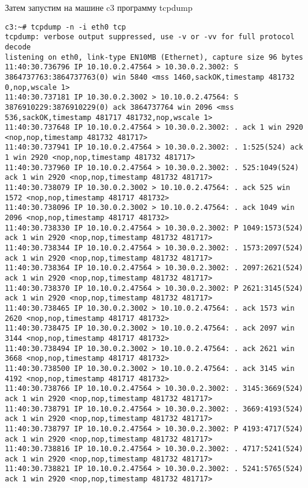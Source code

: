 \documentclass[a4paper,12pt]{article}
\begin{document}
Затем запустим на машине c3 программу tcpdump
\begin{lstlisting}
c3:~# tcpdump -n -i eth0 tcp
tcpdump: verbose output suppressed, use -v or -vv for full protocol decode
listening on eth0, link-type EN10MB (Ethernet), capture size 96 bytes
11:40:30.736796 IP 10.10.0.2.47564 > 10.30.0.2.3002: S 3864737763:3864737763(0) win 5840 <mss 1460,sackOK,timestamp 481732 0,nop,wscale 1>
11:40:30.737181 IP 10.30.0.2.3002 > 10.10.0.2.47564: S 3876910229:3876910229(0) ack 3864737764 win 2096 <mss 536,sackOK,timestamp 481717 481732,nop,wscale 1>
11:40:30.737648 IP 10.10.0.2.47564 > 10.30.0.2.3002: . ack 1 win 2920 <nop,nop,timestamp 481732 481717>
11:40:30.737941 IP 10.10.0.2.47564 > 10.30.0.2.3002: . 1:525(524) ack 1 win 2920 <nop,nop,timestamp 481732 481717>
11:40:30.737960 IP 10.10.0.2.47564 > 10.30.0.2.3002: . 525:1049(524) ack 1 win 2920 <nop,nop,timestamp 481732 481717>
11:40:30.738079 IP 10.30.0.2.3002 > 10.10.0.2.47564: . ack 525 win 1572 <nop,nop,timestamp 481717 481732>
11:40:30.738096 IP 10.30.0.2.3002 > 10.10.0.2.47564: . ack 1049 win 2096 <nop,nop,timestamp 481717 481732>
11:40:30.738330 IP 10.10.0.2.47564 > 10.30.0.2.3002: P 1049:1573(524) ack 1 win 2920 <nop,nop,timestamp 481732 481717>
11:40:30.738344 IP 10.10.0.2.47564 > 10.30.0.2.3002: . 1573:2097(524) ack 1 win 2920 <nop,nop,timestamp 481732 481717>
11:40:30.738364 IP 10.10.0.2.47564 > 10.30.0.2.3002: . 2097:2621(524) ack 1 win 2920 <nop,nop,timestamp 481732 481717>
11:40:30.738370 IP 10.10.0.2.47564 > 10.30.0.2.3002: P 2621:3145(524) ack 1 win 2920 <nop,nop,timestamp 481732 481717>
11:40:30.738465 IP 10.30.0.2.3002 > 10.10.0.2.47564: . ack 1573 win 2620 <nop,nop,timestamp 481717 481732>
11:40:30.738475 IP 10.30.0.2.3002 > 10.10.0.2.47564: . ack 2097 win 3144 <nop,nop,timestamp 481717 481732>
11:40:30.738494 IP 10.30.0.2.3002 > 10.10.0.2.47564: . ack 2621 win 3668 <nop,nop,timestamp 481717 481732>
11:40:30.738500 IP 10.30.0.2.3002 > 10.10.0.2.47564: . ack 3145 win 4192 <nop,nop,timestamp 481717 481732>
11:40:30.738766 IP 10.10.0.2.47564 > 10.30.0.2.3002: . 3145:3669(524) ack 1 win 2920 <nop,nop,timestamp 481732 481717>
11:40:30.738791 IP 10.10.0.2.47564 > 10.30.0.2.3002: . 3669:4193(524) ack 1 win 2920 <nop,nop,timestamp 481732 481717>
11:40:30.738797 IP 10.10.0.2.47564 > 10.30.0.2.3002: P 4193:4717(524) ack 1 win 2920 <nop,nop,timestamp 481732 481717>
11:40:30.738816 IP 10.10.0.2.47564 > 10.30.0.2.3002: . 4717:5241(524) ack 1 win 2920 <nop,nop,timestamp 481732 481717>
11:40:30.738821 IP 10.10.0.2.47564 > 10.30.0.2.3002: . 5241:5765(524) ack 1 win 2920 <nop,nop,timestamp 481732 481717>

\end{lstlisting}
\end{document}
